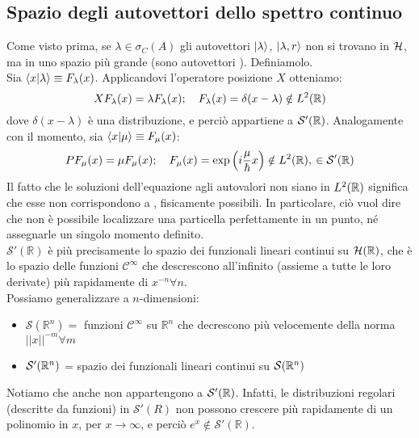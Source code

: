 \documentclass[../../FisicaTeorica.tex]{subfiles}
\begin{document}
\subsection{Spazio degli autovettori dello spettro continuo}
Come visto prima, se $\lambda \in \sigma_C(A)$ gli autovettori $\ket{\lambda}$, $\ket{\lambda,r}$ non si trovano in $\mathcal{H}$, ma in uno spazio più grande (sono autovettori ). Definiamolo.\\
Sia $\braket{x|\lambda} \equiv F_\lambda(x)$. Applicandovi l'operatore posizione $X$ otteniamo:
\[
XF_\lambda(x) = \lambda F_\lambda(x); \quad F_\lambda(x) = \delta(x-\lambda) \notin L^2(\mathbb{R})
\]
dove $\delta(x-\lambda)$ è una distribuzione, e perciò appartiene a $\mathcal{S}'(\mathbb{R})$. Analogamente con il momento, sia $\braket{x|\mu}\equiv F_\mu(x)$:
\[
P F_\mu(x) = \mu F_\mu(x); \quad F_\mu(x) = \exp\left ( i\frac{\mu}{\hbar}x\right ) \notin L^2(\mathbb{R}),\> \in \mathcal{S}'(\mathbb{R})
\] %
Il fatto che le soluzioni dell'equazione agli autovalori non siano in $L^2(\mathbb{R})$ significa che esse non corrispondono a , fisicamente possibili. In particolare, ciò vuol dire che non è possibile localizzare una particella perfettamente in un punto, né assegnarle un singolo momento definito.\\
$\mathcal{S}'\left(\mathbb{R}\right)$ è più precisamente lo spazio dei funzionali lineari continui su $\mathcal{H}(\mathbb{R})$, che è lo spazio delle funzioni $\mathcal{C}^\infty$ che descrescono all'infinito (assieme a tutte le loro derivate) più rapidamente di $x^{-n} \forall n$.\\
Possiamo generalizzare a $n$-dimensioni:
\begin{itemize}
    \item $\mathcal{S}\left(\mathbb{R}^n\right)=$ funzioni $\mathcal{C}^\infty$ su $\mathbb{R}^n$ che decrescono più velocemente della norma $\left|\left|x\right|\right|^{-m} \forall m$
    \item $\mathcal{S}'(\mathbb{R}^n)$ = spazio dei funzionali lineari continui su $\mathcal{S}(\mathbb{R}^n)$
\end{itemize}
\begin{oss}
Notiamo che anche  non appartengono a $\mathcal{S}'(\mathbb{R})$. Infatti, le distribuzioni regolari (descritte da funzioni) in $\mathcal{S}'(R)$ non possono crescere più rapidamente  di un polinomio in $x$, per $x\rightarrow \infty$, e perciò $e^x\notin \mathcal{S}'\left(\mathbb{R}\right)$.
\end{oss}
\end{document}
